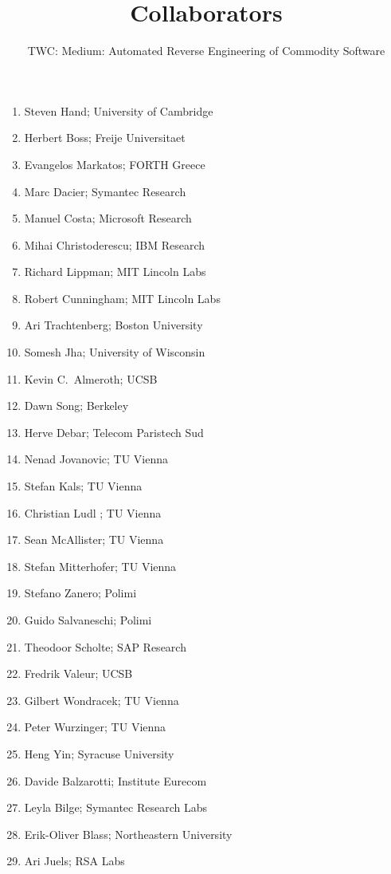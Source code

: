 \documentclass[letterpaper,11pt]{scrartcl}
\newcommand{\thetitle}{TWC: Medium: Automated Reverse Engineering of Commodity Software\xspace}
\begin{document}
\title{Collaborators}
\subtitle{\thetitle}
\author{}
\date{}
\maketitle

\begin{enumerate}
    \item Steven Hand; University of Cambridge
    \item Herbert Boss; Freije Universitaet
    \item Evangelos Markatos; FORTH Greece
    \item Marc Dacier; Symantec Research
    \item Manuel Costa; Microsoft Research
    \item Mihai Christoderescu; IBM Research
    \item Richard Lippman; MIT Lincoln Labs
    \item Robert Cunningham; MIT Lincoln Labs
    \item Ari Trachtenberg; Boston University
    \item Somesh Jha; University of Wisconsin
    \item Kevin C.~Almeroth; UCSB
    \item Dawn Song; Berkeley
    \item Herve Debar; Telecom Paristech Sud
    \item Nenad Jovanovic; TU Vienna
    \item Stefan Kals; TU Vienna
    \item Christian Ludl ; TU Vienna
    \item Sean McAllister; TU Vienna
    \item Stefan Mitterhofer; TU Vienna
    \item Stefano Zanero; Polimi
    \item Guido Salvaneschi; Polimi
    \item Theodoor Scholte; SAP Research
    \item Fredrik Valeur; UCSB
    \item Gilbert Wondracek; TU Vienna
    \item Peter Wurzinger; TU Vienna
    \item Heng Yin; Syracuse University
    \item Davide Balzarotti; Institute Eurecom
    \item Leyla Bilge; Symantec Research Labs
    \item Erik-Oliver Blass; Northeastern University
    \item Ari Juels; RSA Labs

\end{enumerate}
\end{document}

